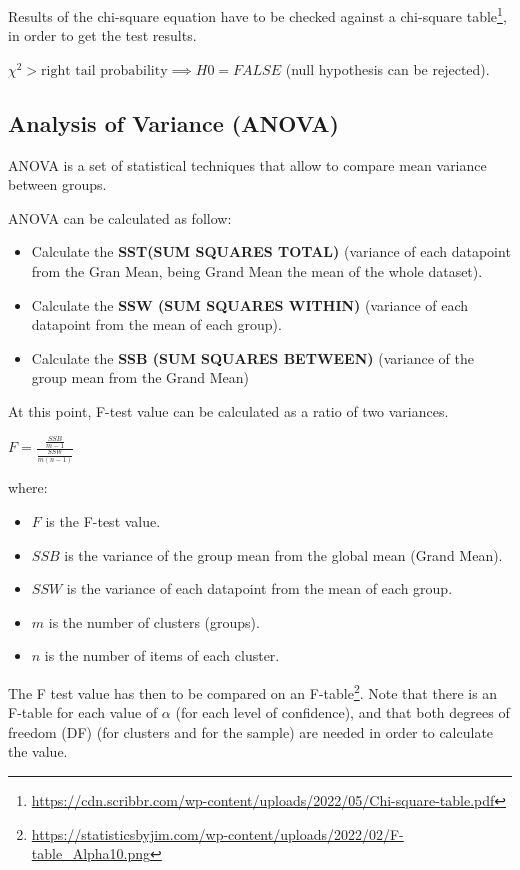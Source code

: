 \documentclass{article}
\begin{document}
Results of the chi-square equation have to be checked against a chi-square table\footnote{\url{https://cdn.scribbr.com/wp-content/uploads/2022/05/Chi-square-table.pdf}}, in order to get the test results. 

$\chi^2 > \text{right tail probability} \implies H0 = FALSE $ (null hypothesis can be rejected).

\subsection{Analysis of Variance (ANOVA)}
ANOVA is a set of statistical techniques that allow to compare mean variance between groups. 

ANOVA can be calculated as follow:
\begin{itemize}
    \item Calculate the \textbf{SST(SUM SQUARES TOTAL)} (variance of each datapoint from the Gran Mean, being Grand Mean the mean of the whole dataset).
    \item Calculate the \textbf{SSW (SUM SQUARES WITHIN)} (variance of each datapoint from the mean of each group).
    \item Calculate the \textbf{SSB (SUM SQUARES BETWEEN)} (variance of the group mean from the Grand Mean)
\end{itemize}

At this point, F-test value can be calculated as a ratio of two variances. 

$ \displaystyle F = \frac{\frac{SSB}{m-1}}{\frac{SSW}{m(n-1)}} $ 

where:
\begin{itemize}
    \item $F$ is the F-test value.
    \item $SSB$ is the variance of the group mean from the global mean (Grand Mean).
    \item $SSW$ is the variance of each datapoint from the mean of each group.
    \item $m$ is the number of clusters (groups).
    \item $n$ is the number of items of each cluster.
\end{itemize}

The F test value has then to be compared on an F-table\footnote{\url{https://statisticsbyjim.com/wp-content/uploads/2022/02/F-table_Alpha10.png}}. Note that there is an F-table for each value of $\alpha$ (for each level of confidence), and that both degrees of freedom (DF) (for clusters and for the sample) are needed in order to calculate the value.
\end{document}
